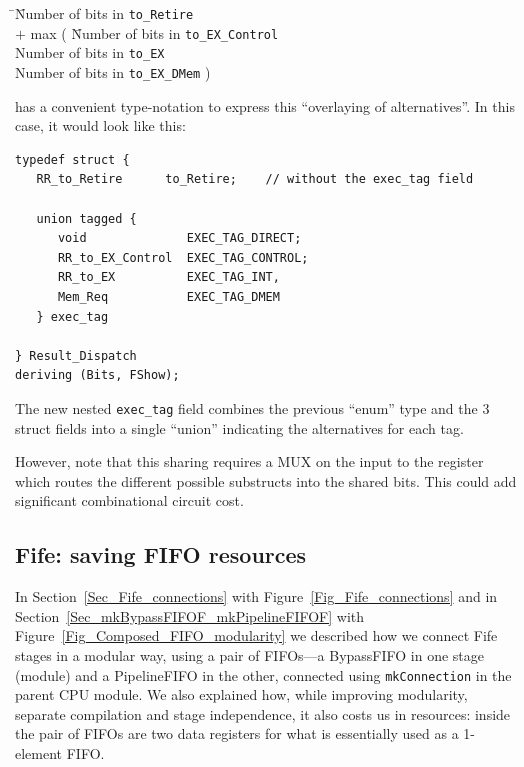 \begin{tabbing}
\hmm \= \hmm \= Number of bits in {\tt to\_Retire} \\
     \> $+$  \> max ( \= Number of bits in {\tt to\_EX\_Control} \\
     \>      \>       \> Number of bits in {\tt to\_EX} \\
     \>      \>       \> Number of bits in {\tt to\_EX\_DMem} )
\end{tabbing}

{\BSV} has a convenient type-notation to express this ``overlaying of
alternatives''.  In this case, it would look like this:

{\footnotesize
\begin{Verbatim}[frame=single]
typedef struct {
   RR_to_Retire      to_Retire;    // without the exec_tag field

   union tagged {
      void              EXEC_TAG_DIRECT;
      RR_to_EX_Control  EXEC_TAG_CONTROL;
      RR_to_EX          EXEC_TAG_INT,
      Mem_Req           EXEC_TAG_DMEM
   } exec_tag

} Result_Dispatch
deriving (Bits, FShow);
\end{Verbatim}
}

The new nested \verb|exec_tag| field combines the previous ``enum''
type and the 3 struct fields into a single ``union'' indicating the
alternatives for each tag.

However, note that this sharing requires a MUX on the input to the
register which routes the different possible substructs into the
shared bits.  This could add significant combinational circuit cost.


\subsection{Fife: saving FIFO resources}

In Section~\ref{Sec_Fife_connections} with
Figure~\ref{Fig_Fife_connections} and in
Section~\ref{Sec_mkBypassFIFOF_mkPipelineFIFOF} with
Figure~\ref{Fig_Composed_FIFO_modularity} we described how we connect
Fife stages in a modular way, using a pair of FIFOs---a BypassFIFO in
one stage (module) and a PipelineFIFO in the other, connected using
\verb|mkConnection| in the parent CPU module.  We also explained how,
while improving modularity, separate compilation and stage
independence, it also costs us in resources: inside the pair of FIFOs
are two data registers for what is essentially used as a 1-element
FIFO.


